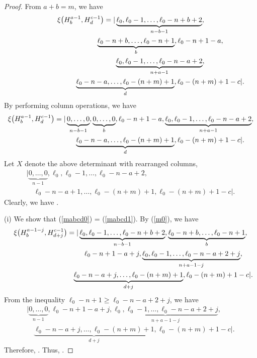 \documentclass[10pt,a4paper]{amsart}
\numberwithin{equation}{section}
\begin{document}
\begin{proof}
From $a+b=m$, we have
\begin{gather}
\xi\bigl(H^{a-1}_{b},H^{c-1}_{d}\bigr)=|\underbrace{\ell_{0},\ell_{0}-1,\dots,\ell_{0}-n+b+2}_{n-b-1},\nonumber\\
\hphantom{\xi\bigl(H^{a-1}_{b},H^{c-1}_{d}\bigr)=|}{}
\underbrace{\ell_{0}-n+b,\dots,\ell_{0}-n+1}_{b},\ell_{0}-n+1-a,\nonumber\\
\hphantom{\xi\bigl(H^{a-1}_{b},H^{c-1}_{d}\bigr)=|}{}
\underbrace{\ell_{0},\ell_{0}-1,\dots,\ell_{0}-n-a+2}_{n+a-1},\nonumber\\
\hphantom{\xi\bigl(H^{a-1}_{b},H^{c-1}_{d}\bigr)=|}{}
\underbrace{\ell_{0}-n-a,\dots,\ell_{0}-(n+m)+1}_{d},\ell_{0}-(n+m)+1-c|.
\label{m0}
\end{gather}
By performing column operations, we have
\begin{gather*}
\xi\bigl(H^{a-1}_{b},H^{c-1}_{d}\bigr)=|\underbrace{0,\dots,0}_{n-b-1},%
\underbrace{0,\dots,0}_{b},\ell_{0}-n+1-a,
\underbrace{\ell_{0},\ell_{0}-1,\dots,\ell_{0}-n-a+2}_{n+a-1},\nonumber\\
\hphantom{\xi\bigl(H^{a-1}_{b},H^{c-1}_{d}\bigr)=|}{}
\underbrace{\ell_{0}-n-a,\dots,\ell_{0}-(n+m)+1}_{d},\ell_{0}-(n+m)+1-c|\nonumber.
\end{gather*}
Let $X$ denote the above determinant with rearranged columns,
\begin{gather*}
| \underbrace{0,\dots,0}_{n-1},
\ell_{0},\ell_{0}-1,\dots,\ell_{0}-n-a+2,\\
\quad{}\ell_{0}-n-a+1,\dots,\ell_{0}-(n+m)+1,\ell_{0}-(n+m)+1-c|\nonumber.
\end{gather*}
Clearly, we have
.

(i) We show that (\ref{mabcd0}) = (\ref{mabcd1}). By (\ref{m0}), we have
\begin{gather*}
\xi\bigl(H^{a-1-j}_{b},H^{c-1}_{d+j}\bigr)=|\underbrace{\ell_{0},\ell_{0}-1,\dots,\ell_{0}-n+b+2}_{n-b-1},\underbrace{\ell_{0}-n+b,\dots,\ell_{0}-n+1}_{b},\nonumber\\
\hphantom{\xi\bigl(H^{a-1-j}_{b},H^{c-1}_{d+j}\bigr)=|}{}\,
\ell_{0}-n+1-a+j,\underbrace{\ell_{0},\ell_{0}-1,\dots,\ell_{0}-n-a+2+j}_{n+a-1-j},\nonumber\\
\hphantom{\xi\bigl(H^{a-1-j}_{b},H^{c-1}_{d+j}\bigr)=|}{}
\underbrace{\ell_{0}-n-a+j,\dots,\ell_{0}-(n+m)+1}_{d+j},\ell_{0}-(n+m)+1-c|\nonumber.
\end{gather*}
From the inequality $\ell_0-n+1\geq\ell_0-n-a+2+j$, we have
\begin{gather*}
|\underbrace{0,\dots,0}_{n-1},\ell_{0}-n+1-a+j,\underbrace{\ell_{0},\ell_{0}-1,\dots,\ell_{0}-n-a+2+j}_{n+a-1-j},\nonumber\\
\quad{}\underbrace{\ell_{0}-n-a+j,\dots,\ell_{0}-(n+m)+1}_{d+j},\ell_{0}-(n+m)+1-c|\nonumber.
\end{gather*}
Therefore, . Thus, .


\end{proof}
\end{document}

